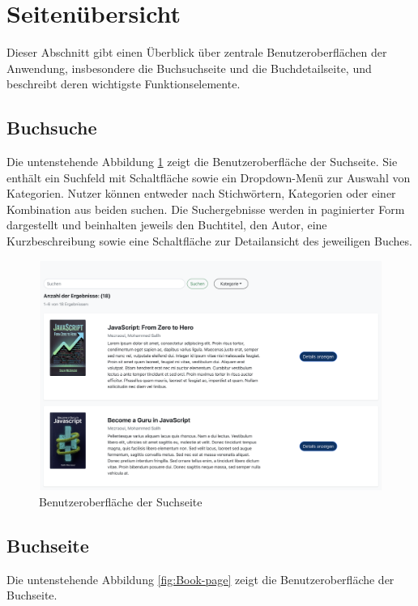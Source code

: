 \section{Seitenübersicht}
Dieser Abschnitt gibt einen Überblick über zentrale Benutzeroberflächen der Anwendung, insbesondere die Buchsuchseite und die Buchdetailseite, und beschreibt deren wichtigste Funktionselemente.

\subsection{Buchsuche}

Die untenstehende Abbildung  \ref{fig:Search-page} zeigt die Benutzeroberfläche der Suchseite. Sie enthält ein Suchfeld mit Schaltfläche sowie ein Dropdown-Menü zur Auswahl von Kategorien. Nutzer können entweder nach Stichwörtern, Kategorien oder einer Kombination aus beiden suchen. Die Suchergebnisse werden in paginierter Form dargestellt und beinhalten jeweils den Buchtitel, den Autor, eine Kurzbeschreibung sowie eine Schaltfläche zur Detailansicht des jeweiligen Buches.

\begin{figure}[H]
	\centering
	\includegraphics[width=1.0\textwidth]{images/UI-screenshots/Search-page.png}%
	\caption{Benutzeroberfläche der Suchseite}
	\label{fig:Search-page}
\end{figure}

\subsection{Buchseite}
Die untenstehende Abbildung  \ref{fig:Book-page} zeigt die Benutzeroberfläche der Buchseite. 

